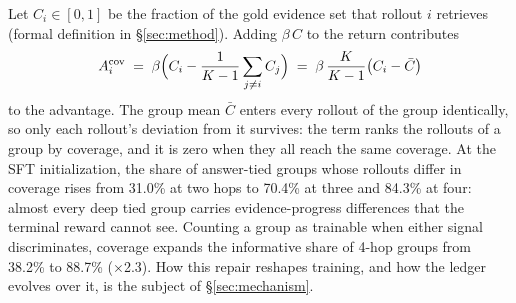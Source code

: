 Let $C_i \in [0,1]$ be the fraction of the gold evidence set that
rollout $i$ retrieves (formal definition in \S\ref{sec:method}). Adding
$\beta\,C$ to the return contributes
\begin{equation}
A^{\mathrm{cov}}_i \;=\; \beta\Bigl(C_i - \frac{1}{K-1}\sum_{j\neq i}
C_j\Bigr) \;=\; \beta\,\frac{K}{K-1}\bigl(C_i - \bar{C}\bigr)
\label{eq:cov-advantage}
\end{equation}
to the advantage. The group mean $\bar{C}$ enters every rollout of
the group identically, so only each rollout's deviation from it
survives: the term ranks the rollouts of a group by coverage, and it
is zero when they all reach the same coverage.
At the SFT initialization,
the share of answer-tied groups whose rollouts differ in coverage rises
from 31.0\% at two hops to 70.4\% at three and 84.3\% at four: almost
every deep tied group carries evidence-progress differences that the
terminal reward cannot see. Counting a group as trainable when either
signal discriminates, coverage expands the informative share of 4-hop
groups from 38.2\% to 88.7\% ($\times$2.3). How this repair reshapes
training, and how the ledger evolves over it, is the subject of
\S\ref{sec:mechanism}.

